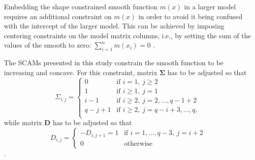 Embedding the shape constrained smooth function \(m(x)\) in a larger model requires an additional constraint on \(m(x)\) in order to avoid it being confused with the intercept of the larger model.  This can be achieved by imposing centering constraints on the model matrix columns, i.e., by setting the sum of the values of the smooth to zero: \(\sum_{i = 1}^n m(x_i) = 0\) \parencite{Pya2015}.

The SCAMs presented in this study constrain the smooth function to be increasing and concave.  For this constraint, matrix \(\symbf{\Sigma}\) has to be adjusted so that
\begin{equation}
  \label{eq:SCAMSigmaIncreasingConcave}
  \Sigma_{i, j} =
  \begin{cases}
    0 &\text{if } i = 1,~ j \geq 2 \\
    1 &\text{if } i \geq 1,~ j = 1 \\
    i - 1 &\text{if } i \geq 2,~ j = 2, \ldots, q - 1 + 2 \\
    q - j + 1 &\text{if } i \geq 2,~ j = q - i + 3, \ldots, q,\\
  \end{cases}
\end{equation}
while matrix \(\symbf{D}\) has to be adjusted so that
\begin{equation}
  \label{eq:SCAMDIncreasingConcave}
  D_{i, j} = 
  \begin{cases}
    - D_{i, j + 1} = 1 &\text{if } i = 1, \ldots, q - 3,~ j = i + 2 \\
    0 &\text{otherwise}
  \end{cases}
\end{equation}
\parencite{Pya2015}.

